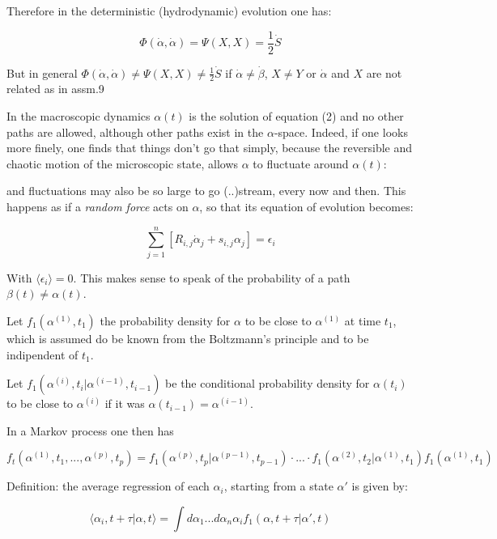 \documentclass{article}
\begin{document}
Therefore in the deterministic (hydrodynamic) evolution one has:

$$ \Phi(\dot{\alpha},\dot{\alpha}) = \Psi(X,X) = \frac{1}{2} \dot{S}$$

But in general $  \Phi(\dot{\alpha},\dot{\alpha}) \neq \Psi(X,X) \neq \frac{1}{2} \dot{S}$ if $\dot{\alpha} \neq \dot{\beta}$, $ X \neq Y$ or $\dot{\alpha}$ and $X$ are not related as in assm.9

In the macroscopic dynamics $\alpha(t)$ is the solution of equation (2) and no other paths are allowed, although other paths exist in the $\alpha$-space. Indeed, if one looks more finely, one finds that things don't go that simply, because the reversible and chaotic motion of the microscopic state, allows $
\alpha$ to fluctuate around $\alpha(t)$: 


and fluctuations may also be so large to go (..)stream, every now and then. This happens as if a \emph{random force} acts on $\alpha$, so that its equation of evolution becomes:

\begin{equation}
\sum_{j=1}^{n}[ R_{i,j} \dot{\alpha}_{j} +  s_{i,j} \alpha_j ] = \epsilon_i
\end{equation}

With $\langle \epsilon_i \rangle =0$. This makes sense to speak of the probability of a path $\beta(t) \neq \alpha(t)$.

Let $f_1(\alpha^{(1)},t_1)$ the probability density for $\alpha$ to be close to $\alpha^{(1)}$ at time $t_1$, which is assumed do be known from the Boltzmann's principle and to be indipendent of $t_1$.

Let $f_1(\alpha^{(i)},t_i|\alpha^{(i-1)},t_{i-1})$ be the conditional probability density for $\alpha(t_i)$ to be close to $\alpha^{(i)}$ if it was $\alpha(t_{i-1}) = \alpha^{(i-1)}$.

In a Markov process one then has

$$f_t(\alpha^{(1)},t_1,...,\alpha^{(p)},t_p) = f_1(\alpha^{(p)},t_p|\alpha^{(p-1)},t_{p-1}) \cdot ... \cdot f_1(\alpha^{(2)},t_2|\alpha^{(1)},t_{1}) f_1(\alpha^{(1)},t_{1})$$

Definition: the average regression of each $\alpha_i$, starting from a state $\alpha'$ is given by:

\begin{equation}
\langle \alpha_i,t+\tau|\alpha,t \rangle = \int d \alpha_1 ... d \alpha_n \alpha_i f_1 (\alpha,t+\tau|\alpha',t)
\end{equation}
\end{document}
